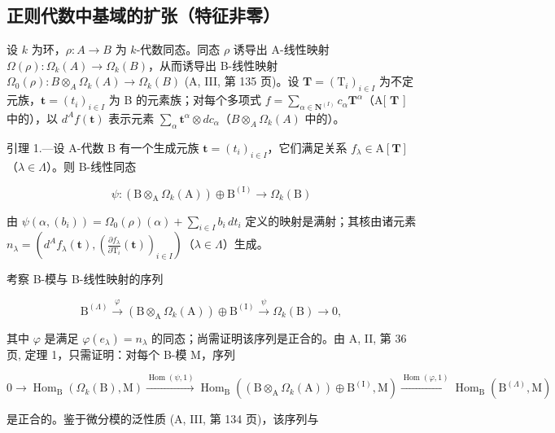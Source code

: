 \subsection{正则代数中基域的扩张（特征非零）}

设 \(k\) 为环，\(\rho: A \to B\) 为 \(k\)-代数同态。同态 \(\rho\) 诱导出 A-线性映射 \(\Omega(\rho): \Omega_k(A) \to \Omega_k(B)\)，从而诱导出 B-线性映射 \(\Omega_0(\rho): B \otimes_A \Omega_k(A) \to \Omega_k(B)\) (A, III, 第 135 页)。设 \(\mathbf{T} = (\mathrm{T}_i)_{i \in I}\) 为不定元族，\(\mathbf{t} = (t_i)_{i \in I}\) 为 B 的元素族；对每个多项式 \(f = \sum_{\alpha \in \mathbf{N}^{(I)}} c_\alpha \mathbf{T}^\alpha\)（A{[} \(\mathbf{T}\) {]} 中的），以 \(d^{A} f(\mathbf{t})\) 表示元素 \(\sum_{\alpha} \mathbf{t}^\alpha \otimes dc_\alpha\)（\(B \otimes_A \Omega_k(A)\) 中的）。

引理 1.—设 A-代数 B 有一个生成元族 \(\mathbf{t} = (t_i)_{i\in I}\)，它们满足关系 \(f_\lambda \in \mathrm{A}[\mathbf{T}]\)（\(\lambda \in \Lambda\)）。则 B-线性同态

\[
\psi : (\mathrm{B} \otimes_ {\mathrm{A}} \Omega_ {k} (\mathrm{A})) \oplus \mathrm{B} ^ {(\mathrm{I})} \longrightarrow \Omega_ {k} (\mathrm{B})
\]

由 \(\psi(\alpha,(b_i)) = \Omega_0(\rho)(\alpha) + \sum_{i\in I}b_i\,dt_i\) 定义的映射是满射；其核由诸元素 \(n_{\lambda} = \left(d^{A}f_{\lambda}(\mathbf{t}),\left(\frac{\partial f_{\lambda}}{\partial\mathrm{T}_{i}}(\mathbf{t})\right)_{i\in I}\right)\)（\(\lambda \in \Lambda\)）生成。

考察 B-模与 B-线性映射的序列

\[
\mathrm{B} ^ {(\Lambda)} \xrightarrow {\varphi} (\mathrm{B} \otimes_ {\mathrm{A}} \Omega_ {k} (\mathrm{A})) \oplus \mathrm{B} ^ {(\mathrm{I})} \xrightarrow {\psi} \Omega_ {k} (\mathrm{B}) \longrightarrow 0,
\]

其中 \(\varphi\) 是满足 \(\varphi(e_{\lambda}) = n_{\lambda}\) 的同态；尚需证明该序列是正合的。由 A, II, 第 36 页, 定理 1，只需证明：对每个 B-模 M，序列

\[
0 \to \operatorname{Hom} _ {\mathrm{B}} (\Omega _{k}(\mathrm{B}), \mathrm{M}) \xrightarrow {\operatorname{Hom}(\psi,1)} \operatorname{Hom} _{\mathrm{B}} ((\mathrm{B} \otimes_{\mathrm{A}} \Omega _{k}(\mathrm{A})) \oplus \mathrm{B}^{(\mathrm{I})}, \mathrm{M}) \xrightarrow {\operatorname{Hom}(\varphi,1)} \operatorname{Hom}_{\mathrm{B}}(\mathrm{B}^{(\Lambda)}, \mathrm{M})
\]

是正合的。鉴于微分模的泛性质 (A, III, 第 134 页)，该序列与

